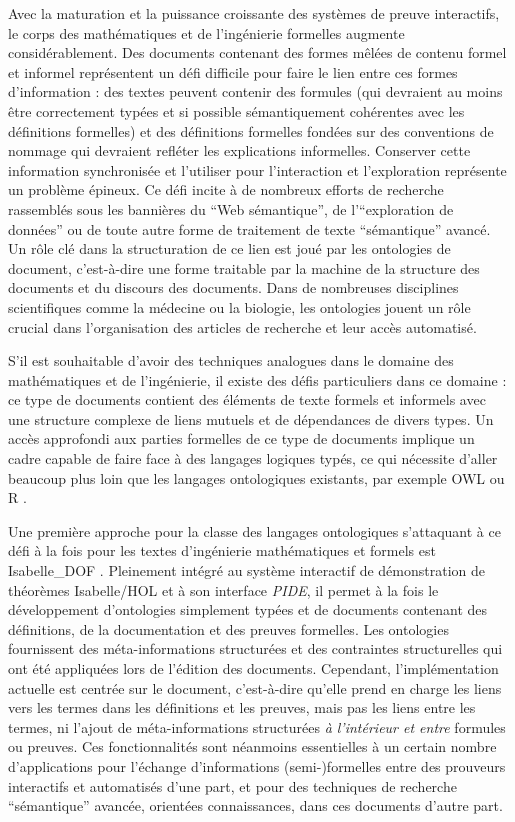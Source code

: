 \documentclass[a4paper,10pt]{article}
\begin{document}
Avec la maturation et la puissance croissante
des systèmes de preuve interactifs,
le corps des mathématiques et de l'ingénierie formelles augmente considérablement.
Des documents contenant
des formes mêlées de contenu formel et informel représentent
un défi difficile pour faire le lien entre ces formes d'information :
des textes peuvent contenir des formules
(qui devraient au moins être correctement typées
et si possible sémantiquement cohérentes avec les définitions formelles)
et des définitions formelles fondées sur des conventions de nommage
qui devraient refléter les explications informelles.
Conserver cette information synchronisée
et l'utiliser pour l'interaction et l'exploration représente
un problème épineux.
Ce défi incite à de nombreux efforts de recherche
rassemblés sous les bannières du \enquote{Web sémantique},
de l'\enquote{exploration de données}
ou de toute autre forme de traitement de texte \enquote{sémantique} avancé.
Un rôle clé dans la structuration de ce lien est joué
par les ontologies de document,
c'est-à-dire une forme traitable par la machine de la structure des documents
et du discours des documents.
Dans de nombreuses disciplines scientifiques comme la médecine ou la biologie,
les ontologies jouent un rôle crucial
dans l'organisation des articles de recherche et leur accès automatisé.

S'il est souhaitable d'avoir des techniques analogues
dans le domaine des mathématiques et de l'ingénierie,
il existe des défis particuliers dans ce domaine :
ce type de documents contient des éléments de texte formels et informels
avec une structure complexe de liens mutuels et de dépendances de divers types.
Un accès approfondi aux parties formelles de ce type de documents implique
un cadre capable de faire face à des langages logiques typés,
ce qui nécessite d'aller beaucoup plus loin
que les langages ontologiques existants,
par exemple OWL ou R \cite {owl2012,protege,owlgred,rontorium}.

Une première approche pour la classe des langages ontologiques
s'attaquant à ce défi
à la fois pour les textes d'ingénierie mathématiques et formels est
Isabelle\_DOF
\cite{
  Brucker-ea.Using-CICM18,
  BruckerWolff.Design-SEFM19,
  BruckerWolff.Certif-IFM19%
}.
Pleinement intégré
au système interactif de démonstration de théorèmes Isabelle/HOL
et à son interface \emph{PIDE},
il permet à la fois le développement d'ontologies simplement typées
et de documents contenant des définitions, de la documentation
et des preuves formelles.
Les ontologies fournissent des méta-informations structurées
et des contraintes structurelles
qui ont été appliquées lors de l'édition des documents.
Cependant, l'implémentation actuelle est centrée sur le document,
c'est-à-dire qu'elle prend en charge les liens vers les termes
dans les définitions et les preuves,
mais pas les liens entre les termes,
ni l'ajout de méta-informations structurées
\emph{à l'intérieur et entre} formules ou preuves.
Ces fonctionnalités sont néanmoins
essentielles à un certain nombre d'applications
pour l'échange d'informations (semi-)formelles
entre des prouveurs interactifs et automatisés d'une part,
et pour des techniques de recherche \enquote{sémantique} avancée,
orientées connaissances, dans ces documents d'autre part.
\end{document}
